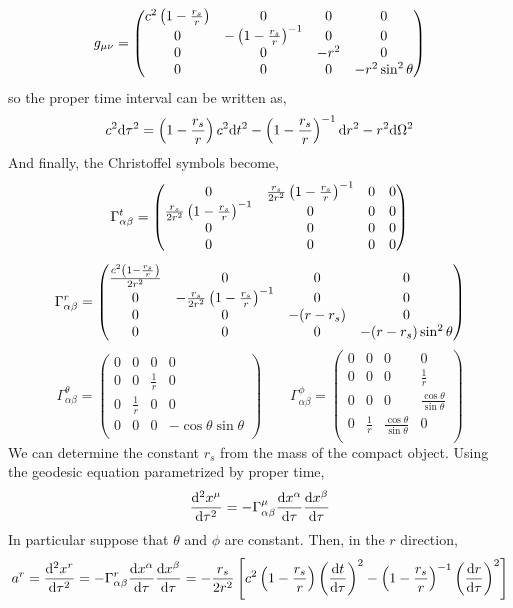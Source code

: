 \documentclass[11pt, a4paper]{article}
\begin{document}
\[ g_{\mu \nu}
= 
\begin{pmatrix}
c^2 \left(1 - \frac{r_s}{r} \right) & 0 & 0 & 0 \\
0 & - \left(1 - \frac{r_s}{r} \right)^{-1} & 0 & 0 \\
0 & 0 & - r^2 & 0 \\
0 & 0 & 0 & - r^2 \sin^2{\theta}
\end{pmatrix}
\]
so the proper time interval can be written as,
\[ c^2 \mathrm{d}\tau^2 = \left(1 - \frac{r_s}{r} \right) c^2 \mathrm{d}t^2 - \left(1 - \frac{r_s}{r} \right)^{-1} \mathrm{d}r^2 - r^2 \mathrm{d}\Omega^2 \]
And finally, the Christoffel symbols become,
\[
\Gamma^t_{\alpha \beta} = 
\begin{pmatrix}
0 & \frac{r_s}{2r^2}\left(1 - \frac{r_s}{r} \right)^{-1} & 0 & 0 \\
\frac{r_s}{2r^2}\left(1 - \frac{r_s}{r} \right)^{-1} & 0 & 0 & 0 \\
0 & 0 & 0 & 0 \\
0 & 0 & 0 & 0
\end{pmatrix}\]
\[
\Gamma^r_{\alpha \beta} = 
\begin{pmatrix}
\frac{c^2 \left(1 - \frac{r_s}{r} \right)}{2 r^2} & 0 & 0 & 0 \\
0 & - \frac{r_s}{2r^2}\left(1 - \frac{r_s}{r} \right)^{-1} & 0 & 0 \\
0 & 0 & - (r - r_s) & 0 \\
0 & 0 & 0 & - (r - r_s) \sin^2{\theta}
\end{pmatrix}
\]
\[
\Gamma^\theta_{\alpha \beta} = 
\begin{pmatrix}
0 & 0 & 0 & 0 \\
0 & 0 & \frac{1}{r} & 0 \\
0 & \frac{1}{r} & 0 & 0 \\
0 & 0 & 0 & - \cos{\theta} \sin{\theta} \\
\end{pmatrix}
\quad \quad 
\Gamma^\phi_{\alpha \beta} = 
\begin{pmatrix}
0 & 0 & 0 & 0 \\
0 & 0 & 0 & \frac{1}{r} \\
0 & 0 & 0 & \frac{\cos{\theta}}{\sin{\theta}} \\
0 & \frac{1}{r} & \frac{\cos{\theta}}{\sin{\theta}} & 0 \\
\end{pmatrix}
\]
We can determine the constant $r_s$ from the mass  of the compact object. Using the geodesic equation parametrized by proper time,
\[ \frac{\mathrm{d}^{2} x^\mu}{\mathrm{d}\tau^{2}} = - \Gamma^\mu_{\alpha \beta} \frac{\mathrm{d}x^\alpha}{\mathrm{d}\tau} \frac{\mathrm{d}x^\beta}{\mathrm{d}\tau} \]
In particular suppose that $\theta$ and $\phi$ are constant. Then, in the $r$ direction,
\[ a^r = \frac{\mathrm{d}^{2} x^r}{\mathrm{d}\tau^{2}} = - \Gamma^r_{\alpha \beta} \frac{\mathrm{d}x^\alpha}{\mathrm{d}\tau} \frac{\mathrm{d}x^\beta}{\mathrm{d}\tau} = -\frac{r_s}{2r^2} \left[  c^2 \left(1 - \frac{r_s}{r} \right) \left( \frac{\mathrm{d}t}{\mathrm{d}\tau} \right)^2 - \left(1 - \frac{r_s}{r} \right)^{-1} \left( \frac{\mathrm{d}r}{\mathrm{d}\tau} \right)^2  \right] \]
\end{document}
